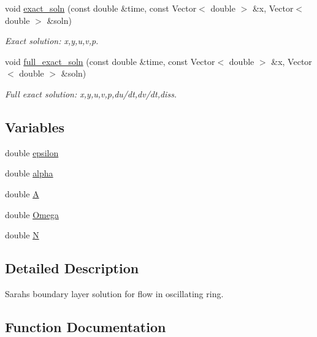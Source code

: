 \begin{DoxyCompactItemize}
void \hyperlink{namespaceoomph_1_1SarahBL_aa198aa1de07bb9a2eac422ed63010bc4}{exact\+\_\+soln} (const double \&time, const Vector$<$ double $>$ \&x, Vector$<$ double $>$ \&soln)
\begin{DoxyCompactList}\small\item\em Exact solution\+: x,y,u,v,p. \end{DoxyCompactList}\item 
void \hyperlink{namespaceoomph_1_1SarahBL_a80c7c03073f6436ace00d2b2c5bfa501}{full\+\_\+exact\+\_\+soln} (const double \&time, const Vector$<$ double $>$ \&x, Vector$<$ double $>$ \&soln)
\begin{DoxyCompactList}\small\item\em Full exact solution\+: x,y,u,v,p,du/dt,dv/dt,diss. \end{DoxyCompactList}\end{DoxyCompactItemize}
\subsection*{Variables}
\begin{DoxyCompactItemize}
\item 
double \hyperlink{namespaceoomph_1_1SarahBL_a21bfe7e71f0baa62022d1ecc9bd175de}{epsilon}
\item 
double \hyperlink{namespaceoomph_1_1SarahBL_ab07de8eb877306afdc10ba4a17c6406b}{alpha}
\item 
double \hyperlink{namespaceoomph_1_1SarahBL_a5b48abf91ca062e8bfeab87f1d4a9499}{A}
\item 
double \hyperlink{namespaceoomph_1_1SarahBL_a370241de5869d0f53fc7cd17858bfbfe}{Omega}
\item 
double \hyperlink{namespaceoomph_1_1SarahBL_a3f2e6fdba588e1883d317f6e0cd7f32f}{N}
\end{DoxyCompactItemize}


\subsection{Detailed Description}
Sarah\textquotesingle{}s boundary layer solution for flow in oscillating ring. 

\subsection{Function Documentation}
\mbox{\label{namespaceoomph_1_1SarahBL_a8dadcc240f5e25e9ba10936749678ff6}} 
